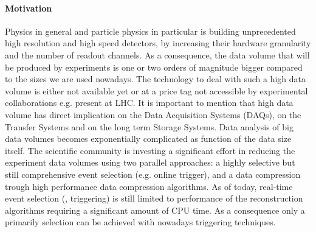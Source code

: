 \paragraph{Motivation}

Physics in general and particle physics in particular is building unprecedented high resolution and high speed detectors, by increasing their hardware granularity and the number of readout channels. As a consequence, the data volume that will be produced by experiments is one or two orders of magnitude bigger compared to the sizes we are used nowadays. The technology to deal with such a high data volume is either not available yet or at a price tag not accessible by experimental collaborations e.g. present at LHC. It is important to mention that high data volume has direct implication on the Data Acquisition Systems (DAQs), on the Transfer Systems and on the long term Storage Systems. Data analysis of big data volumes becomes exponentially complicated as function of the data size itself. The scientific community is investing a significant effort in reducing the experiment data volumes using two parallel approaches: a highly selective but still comprehensive event selection (e.g. online trigger), and a data compression trough high performance data compression algorithms. 
As of today, real-time event selection (\ie, triggering) is still limited to performance of the reconstruction algorithms requiring a significant amount of CPU time. As a consequence only a primarily selection can be achieved with nowadays triggering techniques. 

